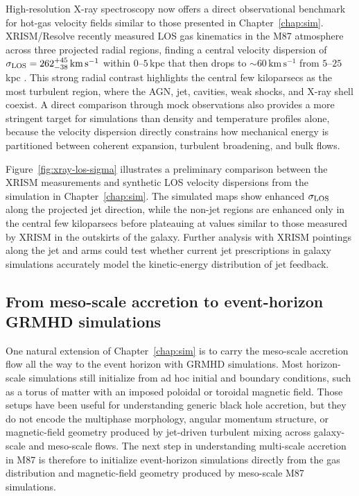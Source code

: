 High-resolution X-ray spectroscopy now offers a direct observational benchmark for hot-gas velocity fields similar to those presented in Chapter~\ref{chap:sim}.
XRISM/Resolve recently measured LOS gas kinematics in the M87 atmosphere across three projected radial regions, finding a central velocity dispersion of $\sigma_{\rm LOS}=262^{+45}_{-38}\,\mathrm{km\,s^{-1}}$ within $0$--$5$\,kpc that then drops to $\sim 60\,\mathrm{km\,s^{-1}}$ from $5$--$25$\,kpc \citep{xrism_collaboration_xrismresolve_2026}.
This strong radial contrast highlights the central few kiloparsecs as the most turbulent region, where the AGN, jet, cavities, weak shocks, and X-ray shell coexist.
A direct comparison through mock observations also provides a more stringent target for simulations than density and temperature profiles alone, because the velocity dispersion directly constrains how mechanical energy is partitioned between coherent expansion, turbulent broadening, and bulk flows.

Figure~\ref{fig:xray-los-sigma} illustrates a preliminary comparison between the XRISM measurements and synthetic LOS velocity dispersions from the simulation in Chapter~\ref{chap:sim}.
The simulated maps show enhanced $\sigma_{\rm LOS}$ along the projected jet direction, while the non-jet regions are enhanced only in the central few kiloparsecs before plateauing at values similar to those measured by XRISM in the outskirts of the galaxy.
Further analysis with XRISM pointings along the jet and arms could test whether current jet prescriptions in galaxy simulations accurately model the kinetic-energy distribution of jet feedback.

\subsection{From meso-scale accretion to event-horizon GRMHD simulations}

One natural extension of Chapter~\ref{chap:sim} is to carry the meso-scale accretion flow all the way to the event horizon with GRMHD simulations.
Most horizon-scale simulations still initialize from ad hoc initial and boundary conditions, such as a torus of matter with an imposed poloidal or toroidal magnetic field.
Those setups have been useful for understanding generic black hole accretion, but they do not encode the multiphase morphology, angular momentum structure, or magnetic-field geometry produced by jet-driven turbulent mixing across galaxy-scale and meso-scale flows.
The next step in understanding multi-scale accretion in M87 is therefore to initialize event-horizon simulations directly from the gas distribution and magnetic-field geometry produced by meso-scale M87 simulations.

